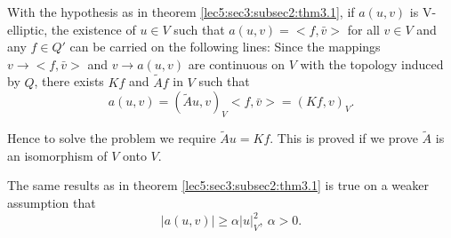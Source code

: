 \begin{exercise}\label{lec6:sec3:subsec3:exr1}%
With the hypothesis as in theorem \ref{lec5:sec3:subsec2:thm3.1}, if $a(u, v)$ is V-elliptic,
the existence of $u \in V$ such that $a(u, v) = <f, \bar{v}>$
for all $v \in V$ and any $f \in Q'$ can be carried on
the following lines: Since the mappings $v \rightarrow <f, \bar{v}>$
and $v \rightarrow a(u, v)$ are continuous on $V$ with the topology
induced by $Q$, there exists $Kf$ and $\tilde{A}f$ in $V$ such that 
$$
a(u, v) = (\tilde{A}u, v)_V <f, \bar{v}> = (Kf, v)_V.
$$

Hence to solve the problem we require $\tilde{A}u = Kf$. This is
proved if we prove $\tilde{A}$ is an isomorphism of $V$ onto $V$. 
\end{exercise}

\begin{exercise}\label{lec6:sec3:subsec3:exr2}%
The same results as in theorem \ref{lec5:sec3:subsec2:thm3.1} is true on a weaker assumption that 
$$
|a(u, v)| \geq \alpha |u|^2_V,~ \alpha > 0.
$$
\end{exercise}

